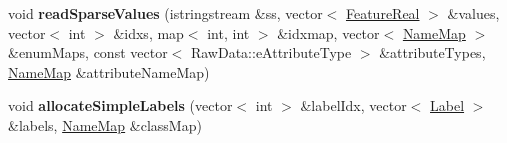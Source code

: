 \begin{DoxyCompactItemize}
\item 
\hypertarget{classMultiBoost_1_1SVMLightParser_a4dab5e54e56154babfd60876f0a6634f}{void {\bfseries read\-Sparse\-Values} (istringstream \&ss, vector$<$ \hyperlink{Defaults_8h_a3a11cfe6a5d469d921716ca6291e934f}{Feature\-Real} $>$ \&values, vector$<$ int $>$ \&idxs, map$<$ int, int $>$ \&idxmap, vector$<$ \hyperlink{classMultiBoost_1_1NameMap}{Name\-Map} $>$ \&enum\-Maps, const vector$<$ Raw\-Data\-::e\-Attribute\-Type $>$ \&attribute\-Types, \hyperlink{classMultiBoost_1_1NameMap}{Name\-Map} \&attribute\-Name\-Map)}\label{classMultiBoost_1_1SVMLightParser_a4dab5e54e56154babfd60876f0a6634f}

\item 
\hypertarget{classMultiBoost_1_1SVMLightParser_adfa32fbfc7db1eb9d40163169d1979f5}{void {\bfseries allocate\-Simple\-Labels} (vector$<$ int $>$ \&label\-Idx, vector$<$ \hyperlink{structMultiBoost_1_1Label}{Label} $>$ \&labels, \hyperlink{classMultiBoost_1_1NameMap}{Name\-Map} \&class\-Map)}\label{classMultiBoost_1_1SVMLightParser_adfa32fbfc7db1eb9d40163169d1979f5}

\end{DoxyCompactItemize}
